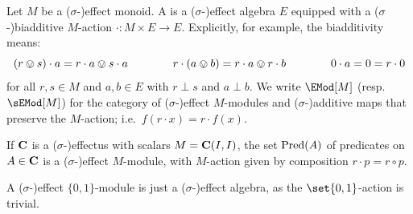 \documentclass[%
	submission,
copyright,creativecommons,UKenglish]{eptcs}
\begin{document}
\begin{definition}
Let $M$ be a ($\sigma$-)effect monoid. %
A 
is a ($\sigma$-)effect algebra %
$E$
equipped with a ($\sigma$-)biadditive %
$M$-action $\cdot \colon M\times E\to E$.
Explicitly, for example, the biadditivity means:
\[
(r\ovee s)\cdot a= r\cdot a\ovee s\cdot a
\qquad\qquad
r\cdot (a\ovee b)= r\cdot a\ovee r\cdot b
\qquad\qquad  0\cdot a= 0 = r\cdot 0
\]
for all $r,s\in M$ and $a,b\in E$ with $r\perp s$
and $a\perp b$.
We write $\EMod[M]$
(resp.~$\sEMod[M]$)
for the category of ($\sigma$-)effect $M$-modules
and ($\sigma$-)additive %
maps that preserve the $M$-action;
i.e.~$f(r\cdot x)=r\cdot f(x)$.
\end{definition}

\begin{example}
  If $\mathbf{C}$ is a ($\sigma$-)effectus
  with scalars $M=\mathbf{C}(I,I)$,
  the set $\mathrm{Pred}(A)$ of predicates
  on $A\in\mathbf{C}$ is a ($\sigma$-)effect $M$-module,
  with $M$-action given by composition $r\cdot p=r\circ p$.
\end{example}

\begin{example}
    A ($\sigma$-)effect $\{0,1\}$-module
    is just a ($\sigma$-)effect algebra,
    as the $\set{0,1}$-action is trivial.
\end{example}
\end{document}
